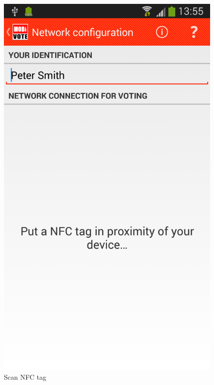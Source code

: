 \documentclass[numbers=noenddot, abstract=on, a4paper, headsepline,
footsepline, oneside, openright, draft=off, listof=leveldown]{scrreprt}
\begin{document}
\begin{figure}[!htb]
\begin{minipage}{.5\textwidth}
		\includegraphics[height=.4\textheight]{img/screenshots/scan_nfc_tag}
		\caption{Scan NFC tag}
		\label{fig:handbook_scannfctag}
	\end{minipage}
\end{figure}
\end{document}
